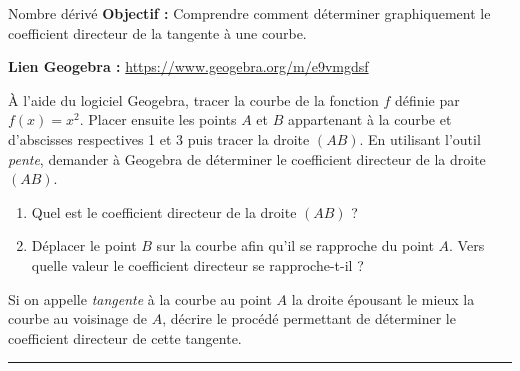 \documentclass[12pt]{article}
\theoremstyle{break}
\begin{document}
\noindent{
\makebox[0pt][l]{\textbf{\Niveau}}%
\makebox[\textwidth][c]{\textbf{\Chapitre}}%
\makebox[0pt][r]{\textbf{\Document}}
}

{

\begin{activite*}{Nombre dérivé}{}
    \textbf{Objectif :} Comprendre comment déterminer graphiquement le coefficient directeur de la tangente à une courbe.
\end{activite*}

\noindent
\textbf{Lien Geogebra :} \url{https://www.geogebra.org/m/e9vmgdsf}

\noindent
À l’aide du logiciel Geogebra, tracer la courbe de la fonction $f$ définie par $f(x) = x^2$. Placer ensuite les points $A$ et $B$ appartenant à la courbe et d’abscisses respectives 1 et 3 puis tracer la droite $(AB)$. En utilisant l’outil \textit{pente}, demander à Geogebra de déterminer le coefficient directeur de la droite $(AB)$.

\begin{enumerate}
    \item Quel est le coefficient directeur de la droite $(AB)$ ?
    \item Déplacer le point $B$ sur la courbe afin qu’il se rapproche du point $A$. Vers quelle valeur le coefficient directeur se rapproche-t-il ?
\end{enumerate}

\begin{bilan*}{}{}
    Si on appelle \textit{tangente} à la courbe au point $A$ la droite épousant le mieux la courbe au voisinage de $A$, décrire le procédé permettant de déterminer le coefficient directeur de cette tangente.
\end{bilan*}
}

\vfill
\hrule
\vfill

\noindent{
\makebox[0pt][l]{\textbf{\Niveau}}%
\makebox[\textwidth][c]{\textbf{\Chapitre}}%
\makebox[0pt][r]{\textbf{\Document}}
}
\end{document}
